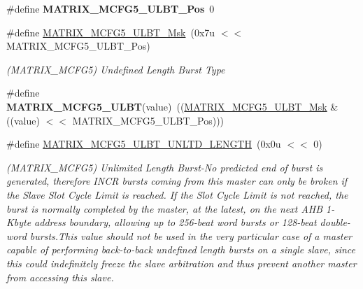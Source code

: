 \begin{DoxyCompactItemize}
\mbox{\label{group__SAMS70__MATRIX_ga9507c5a287a45c0bc179c73688871fa8}} 
\#define {\bfseries M\+A\+T\+R\+I\+X\+\_\+\+M\+C\+F\+G5\+\_\+\+U\+L\+B\+T\+\_\+\+Pos}~0
\item 
\mbox{\label{group__SAMS70__MATRIX_gacfb737383bff73d613bc283bc9f13776}} 
\#define \mbox{\hyperlink{group__SAMS70__MATRIX_gacfb737383bff73d613bc283bc9f13776}{M\+A\+T\+R\+I\+X\+\_\+\+M\+C\+F\+G5\+\_\+\+U\+L\+B\+T\+\_\+\+Msk}}~(0x7u $<$$<$ M\+A\+T\+R\+I\+X\+\_\+\+M\+C\+F\+G5\+\_\+\+U\+L\+B\+T\+\_\+\+Pos)
\begin{DoxyCompactList}\small\item\em (M\+A\+T\+R\+I\+X\+\_\+\+M\+C\+F\+G5) Undefined Length Burst Type \end{DoxyCompactList}\item 
\mbox{\label{group__SAMS70__MATRIX_ga279ce09b25671448ae4a58ec546b2465}} 
\#define {\bfseries M\+A\+T\+R\+I\+X\+\_\+\+M\+C\+F\+G5\+\_\+\+U\+L\+BT}(value)~((\mbox{\hyperlink{group__SAMS70__MATRIX_gacfb737383bff73d613bc283bc9f13776}{M\+A\+T\+R\+I\+X\+\_\+\+M\+C\+F\+G5\+\_\+\+U\+L\+B\+T\+\_\+\+Msk}} \& ((value) $<$$<$ M\+A\+T\+R\+I\+X\+\_\+\+M\+C\+F\+G5\+\_\+\+U\+L\+B\+T\+\_\+\+Pos)))
\item 
\mbox{\label{group__SAMS70__MATRIX_gac7a55783d3fe37a2f92da44224a37b8f}} 
\#define \mbox{\hyperlink{group__SAMS70__MATRIX_gac7a55783d3fe37a2f92da44224a37b8f}{M\+A\+T\+R\+I\+X\+\_\+\+M\+C\+F\+G5\+\_\+\+U\+L\+B\+T\+\_\+\+U\+N\+L\+T\+D\+\_\+\+L\+E\+N\+G\+TH}}~(0x0u $<$$<$ 0)
\begin{DoxyCompactList}\small\item\em (M\+A\+T\+R\+I\+X\+\_\+\+M\+C\+F\+G5) Unlimited Length Burst-\/\+No predicted end of burst is generated, therefore I\+N\+CR bursts coming from this master can only be broken if the Slave Slot Cycle Limit is reached. If the Slot Cycle Limit is not reached, the burst is normally completed by the master, at the latest, on the next A\+HB 1-\/Kbyte address boundary, allowing up to 256-\/beat word bursts or 128-\/beat double-\/word bursts.\+This value should not be used in the very particular case of a master capable of performing back-\/to-\/back undefined length bursts on a single slave, since this could indefinitely freeze the slave arbitration and thus prevent another master from accessing this slave. \end{DoxyCompactList}\item 
$$
\end{DoxyCompactItemize}
